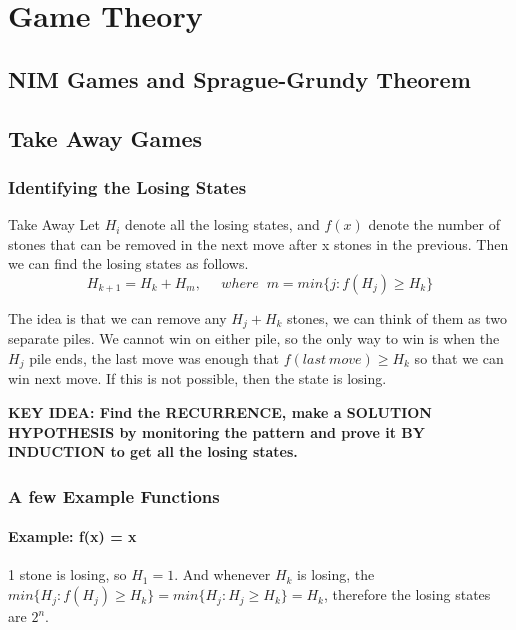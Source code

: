 \chapter{Game Theory}



\section{NIM Games and Sprague-Grundy Theorem}



\section{Take Away Games}


\subsection{Identifying the Losing States}

\begin{theorem}{Take Away}
  Let $H_i$ denote all the losing states, and $f(x)$ denote the number of stones that can be removed in the next move after x stones in the previous. Then we can find the losing states as follows.
  \begin{equation}
    H_{k+1} = H_k + H_m, \;\;\;\;\; where \;\; m = min \{j: f(H_j) \geq H_k\}    
  \end{equation}
\end{theorem}
The idea is that we can remove any $H_j + H_k$ stones, we can think of them as two separate piles. We cannot win on either pile, so the only way to win is when the $H_j$ pile ends, the last move was enough that $f(last\:move) \geq H_k$ so that we can win next move. If this is not possible, then the state is losing.

\textbf{KEY IDEA: Find the RECURRENCE, make a SOLUTION HYPOTHESIS by monitoring the pattern and prove it BY INDUCTION to get all the losing states.}


\subsection{A few Example Functions}

\subsubsection{Example: f(x) = x}
1 stone is losing, so $H_1 = 1$. And whenever $H_k$ is losing, the $min\{H_j : f(H_j) \geq H_k\} = min\{H_j : H_j \geq H_k\} = H_k$, therefore the losing states are $2^n$.
